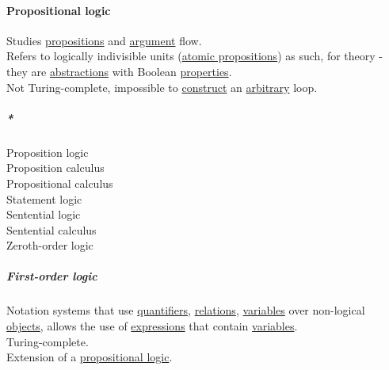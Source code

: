 \documentclass[11pt]{article}
\begin{document}
\paragraph{\label{orgb1d29e6}Propositional logic}
\label{sec:org07801d6}
Studies \hyperref[org4320b73]{propositions} and \hyperref[orgf66a5f7]{argument} flow.\\

Refers to logically indivisible units (\hyperref[orge2b30c4]{atomic propositions}) as such, for theory - they are \hyperref[orgabcd7a1]{abstractions} with Boolean \hyperref[org763ad6b]{properties}.\\

Not Turing-complete, impossible to \hyperref[orgc1046f9]{construct} an \hyperref[orgbfdf9b7]{arbitrary} loop.\\

\subparagraph{\emph{*}}
\label{sec:orgb93ab62}

\label{orgcc3ce88}Proposition logic\\
\label{org1ed55e6}Proposition calculus\\
\label{orgae88cf7}Propositional calculus\\
\label{orge0c593f}Statement logic\\
\label{org384d229}Sentential logic\\
\label{org7b1d8a1}Sentential calculus\\
\label{org6af5ad6}Zeroth-order logic\\

\subparagraph{\label{orgc8d3455}First-order logic}
\label{sec:org1f90493}
Notation systems that use \hyperref[orga67c681]{quantifiers}, \hyperref[org5e14e7d]{relations}, \hyperref[orgd3f3ade]{variables} over non-logical \hyperref[orge0f000f]{objects}, allows the use of \hyperref[org9eb2c72]{expressions} that contain \hyperref[orgd3f3ade]{variables}.\\

Turing-complete.\\

Extension of a \hyperref[orgb1d29e6]{propositional logic}.\\
\end{document}
